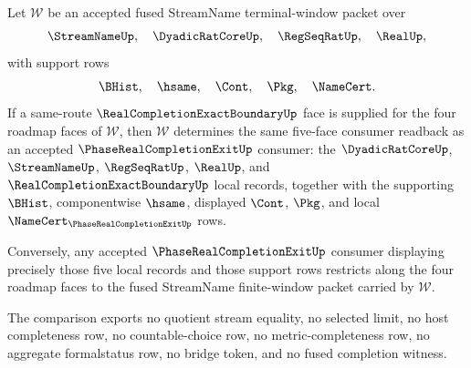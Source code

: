 \begin{theorem}
\label{thm:streamname-terminal-fusion-phase-exit-consumer-readback}
Let $\mathcal W$ be an accepted fused StreamName terminal-window packet over
$$
\StreamNameUp,\quad \DyadicRatCoreUp,\quad \RegSeqRatUp,\quad \RealUp,
$$
with support rows
$$
\BHist,\quad \hsame,\quad \Cont,\quad \Pkg,\quad \NameCert.
$$
If a same-route $\RealCompletionExactBoundaryUp$ face is supplied for the four
roadmap faces of $\mathcal W$, then $\mathcal W$ determines the same five-face
consumer readback as an accepted $\PhaseRealCompletionExitUp$ consumer: the
$\DyadicRatCoreUp$, $\StreamNameUp$, $\RegSeqRatUp$, $\RealUp$, and
$\RealCompletionExactBoundaryUp$ local records, together with the supporting
$\BHist$, componentwise $\hsame$, displayed $\Cont$, $\Pkg$, and local
$\NameCert_{\PhaseRealCompletionExitUp}$ rows.

Conversely, any accepted $\PhaseRealCompletionExitUp$ consumer displaying
precisely those five local records and those support rows restricts along the
four roadmap faces to the fused StreamName finite-window packet carried by
$\mathcal W$.

The comparison exports no quotient stream equality, no selected limit, no host
completeness row, no countable-choice row, no metric-completeness row, no
aggregate formalstatus row, no bridge token, and no fused completion witness.
\end{theorem}
